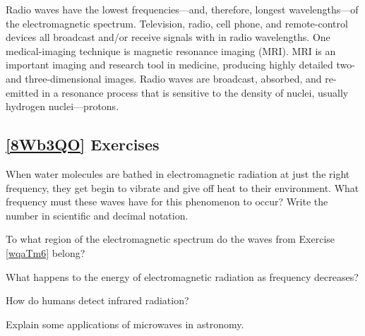 \documentclass[main.tex]{subfiles}
\begin{document}
Radio waves have the lowest frequencies---and, therefore, longest wavelengths---of the electromagnetic spectrum. Television, radio, cell phone, and remote-control devices all broadcast and/or receive signals with in radio wavelengths. One medical-imaging technique is magnetic resonance imaging (MRI). MRI is an important imaging and research tool in medicine, producing highly detailed two- and three-dimensional images. Radio waves are broadcast, absorbed, and re-emitted in a resonance process that is sensitive to the density of nuclei, usually hydrogen nuclei---protons.

\clearpage
\subsection*{\ref{8Wb3QO} Exercises}


\begin{exercise} \label{wqaTm6}
    When water molecules are bathed in electromagnetic radiation at just the right frequency, they get begin to vibrate and give off heat to their environment. What frequency must these waves have for this phenomenon to occur? Write the number in scientific and decimal notation.
\end{exercise}

\begin{exercise}
    To what region of the electromagnetic spectrum do the waves from Exercise \ref{wqaTm6} belong? 
\end{exercise}

\begin{exercise}
    What happens to the energy of electromagnetic radiation as frequency decreases?
\end{exercise}

\begin{exercise}
    How do humans detect infrared radiation?
\end{exercise}

\begin{exercise}
    Explain some applications of microwaves in astronomy. 
\end{exercise}
\end{document}
